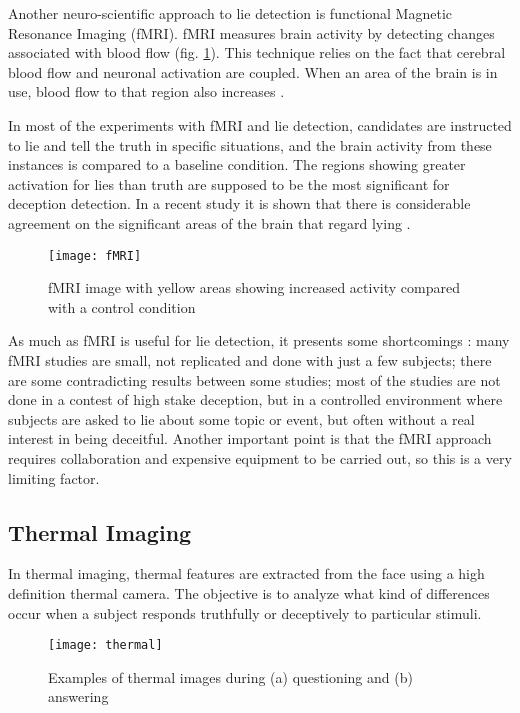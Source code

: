 Another neuro-scientific approach to lie detection is functional Magnetic Resonance Imaging (fMRI). fMRI measures brain activity by detecting changes associated with blood flow (fig. \ref{fig:fMRI}). This technique relies on the fact that cerebral blood flow and neuronal activation are coupled. When an area of the brain is in use, blood flow to that region also increases \cite{WikifMRI}.

In most of the experiments with fMRI and lie detection, candidates are instructed to lie and tell the truth in specific situations, and the brain activity from these instances is compared to a baseline condition. The regions showing greater activation for lies than truth are supposed to be the most significant for deception detection. In a recent study it is shown that there is considerable agreement on the significant areas of the brain that regard lying \cite{fMRILD}.

\begin{figure}[H]
	\centering
	\texttt{[image: fMRI]}
	\caption{fMRI image with yellow areas showing increased activity compared with a control condition  \cite{WikifMRI}}
	\label{fig:fMRI}
\end{figure}

As much as fMRI is useful for lie detection, it presents some shortcomings \cite{fMRIDD} \cite{fMRIDA}: many fMRI studies are small, not replicated and done with just a few subjects; there are some contradicting results between some studies; most of the studies are not done in a contest of high stake deception, but in a controlled environment where subjects are asked to lie about some topic or event, but often without a real interest in being deceitful. Another important point is that the fMRI approach requires collaboration and expensive equipment to be carried out, so this is a very limiting factor.

\subsection{Thermal Imaging}
In thermal imaging, thermal features are extracted from the face using a high definition thermal camera. The objective is to analyze what kind of differences occur when a subject responds truthfully or deceptively to particular stimuli.

\begin{figure}[H]
	\centering
	\texttt{[image: thermal]}
	\caption{Examples of thermal images during (a) questioning and (b) answering \cite{6967765}}
\end{figure}

